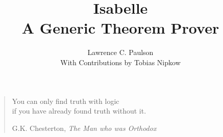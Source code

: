 
\sloppy

\title{Isabelle\\A Generic Theorem Prover}
\author{Lawrence C. Paulson\\[2ex] With Contributions by Tobias Nipkow}

\date{} 
\makeindex
\let\idx=\ttindexbold
\newcommand\cdx[1]{{\tt#1}\index{#1@{\tt#1} constant}}
\newcommand\sdx[1]{{\tt#1}\index{#1@{\tt#1} symbol}}

\newcommand\tdx[1]{{\tt#1}\index{#1@{\tt#1} theorem}}
\newcommand\tdxbold[1]{{\tt#1}\index{#1@{\tt#1} theorem|bold}}

\newcommand\mltydx[1]{{\tt#1}\index{#1@{\tt#1} ML type}}
\newcommand\xdx[1]{{\tt#1}\index{#1@{\tt#1} exception}}

\newcommand\ndx[1]{{\tt#1}\index{#1@{\tt#1} nonterminal}}
\newcommand\ndxbold[1]{{\tt#1}\index{#1@{\tt#1} nonterminal|bold}}

\newcommand\cldx[1]{{\tt#1}\index{#1@{\tt#1} class}}
\newcommand\tydx[1]{{\tt#1}\index{#1@{\tt#1} type}}
\newcommand\thydx[1]{{\tt#1}\index{#1@{\tt#1} theory}}

\def\S{Sect.\thinspace}%

\underscoreoff

\setcounter{secnumdepth}{2} \setcounter{tocdepth}{1}

\binperiod     %


\maketitle



\tableofcontents
\newpage
\listoffigures
\newpage


\markboth{}{}
\vspace*{2.5cm}
\begin{quote}
\raggedleft
{\sanssi
You can only find truth with logic\\
if you have already found truth without it.}\\
\bigskip

G.K. Chesterton, {\em The Man who was Orthodox}
\end{quote}


